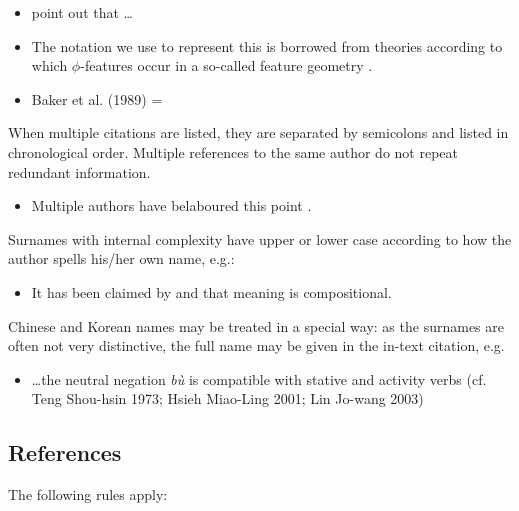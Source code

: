 \documentclass[charis,linguex]{glossa}
\begin{document}
\begin{itemize}
\item \citet[514]{murray:1983} point out that \ldots
\item The notation we use to represent this is borrowed from theories according to which $\phi$-features occur in a so-called feature geometry \citep[248-250]{mccarthy:1999}.
\item Baker et al. (1989) = \citet*{baker:1989}
\end{itemize}
When multiple citations are listed, they are separated by semicolons and listed in chronological order. Multiple references to the same author do not repeat redundant information.

\begin{itemize}
\item Multiple authors have belaboured this point \citep{chomsky:1981,chomsky:1986a,chomsky:1986,iverson:1989,casali:1998a,blevins:2004,franks:2005}.
\end{itemize}
Surnames with internal complexity have upper or lower case according to how the author spells his/her own name, e.g.:

\begin{itemize}
\item It has been claimed by \citet{swart:1998} and \citet{belder:2011} that meaning is compositional. 
\end{itemize}
Chinese and Korean names may be treated in a special way: as the surnames are often not very distinctive, the full name may be given in the in-text citation, e.g.

\begin{itemize}
\item  \ldots the neutral negation \textit{bù} is compatible with stative and activity verbs (cf. Teng Shou-hsin 1973; Hsieh Miao-Ling 2001; Lin Jo-wang 2003) %
\end{itemize}

\subsection{References}\label{sec:refs}

The following rules apply:
\end{document}
